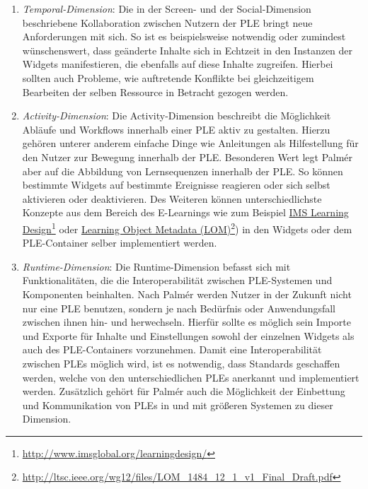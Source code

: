 \begin{enumerate}
 \item \emph{Temporal-Dimension}: Die in der Screen- und der Social-Dimension beschriebene Kollaboration zwischen Nutzern der PLE bringt neue Anforderungen mit sich. So ist es beispielsweise notwendig oder zumindest wünschenswert, dass geänderte Inhalte sich in Echtzeit in den Instanzen der Widgets manifestieren, die ebenfalls auf diese Inhalte zugreifen. Hierbei sollten auch Probleme, wie auftretende Konflikte bei gleichzeitigem Bearbeiten der selben Ressource in Betracht gezogen werden.
 \item \emph{Activity-Dimension}: Die Activity-Dimension beschreibt die Möglichkeit Abläufe und Workflows innerhalb einer PLE aktiv zu gestalten. Hierzu gehören unterer anderem einfache Dinge wie Anleitungen als Hilfestellung für den Nutzer zur Bewegung innerhalb der PLE. Besonderen Wert legt Palmér aber auf die Abbildung von Lernsequenzen innerhalb der PLE. So können bestimmte Widgets auf bestimmte Ereignisse reagieren oder sich selbst aktivieren oder deaktivieren. Des Weiteren können unterschiedlichste Konzepte aus dem Bereich des E-Learnings wie zum Beispiel \href{http://www.imsglobal.org/learningdesign/}{IMS Learning Design}\footnote{\url{http://www.imsglobal.org/learningdesign/}} oder \href{http://ltsc.ieee.org/wg12/files/LOM_1484_12_1_v1_Final_Draft.pdf}{Learning Object Metadata (LOM)}\footnote{\url{http://ltsc.ieee.org/wg12/files/LOM_1484_12_1_v1_Final_Draft.pdf}}) in den Widgets oder dem PLE-Container selber implementiert werden.
 \item \emph{Runtime-Dimension}: Die Runtime-Dimension befasst sich mit Funktionalitäten, die die Interoperabilität zwischen PLE-Systemen und Komponenten beinhalten. Nach Palmér werden Nutzer in der Zukunft nicht nur eine PLE benutzen, sondern je nach Bedürfnis oder Anwendungsfall zwischen ihnen hin- und herwechseln. Hierfür sollte es möglich sein Importe und Exporte für Inhalte und Einstellungen sowohl der einzelnen Widgets als auch des PLE-Containers vorzunehmen. Damit eine Interoperabilität
 zwischen PLEs möglich wird, ist es notwendig, dass Standards geschaffen werden, welche von den unterschiedlichen PLEs anerkannt und implementiert werden. Zusätzlich gehört für Palmér auch die Möglichkeit der Einbettung und Kommunikation von PLEs in und mit größeren Systemen zu dieser Dimension.
\end{enumerate}

